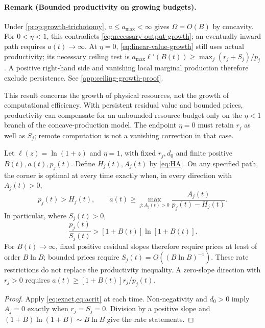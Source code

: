 \paragraph{Remark (Bounded productivity on growing budgets).}
Under \cref{prop:growth-trichotomy}, $a\leq a_{\max}<\infty$ gives
$\Omega=O(B)$ by concavity. For $0<\eta<1$, this contradicts
\cref{eq:necessary-output-growth}; an eventually inward path requires
$a(t)\to\infty$. At $\eta=0$, \cref{eq:linear-value-growth} still uses
actual productivity; its necessary ceiling test is
$a_{\max}\ell'(B(t))\geq\max_j(r_j+S_j)/p_j$.
A positive right-hand side and vanishing local marginal production
therefore exclude persistence. See \cref{app:ceiling-growth-proof}.

This result concerns the growth of physical resources, not the growth
of computational efficiency. With persistent residual value and bounded
prices, productivity can compensate for an unbounded resource budget
only on the $\eta<1$ branch of the concave-production model. The endpoint
$\eta=0$ must retain $r_j$ as well as $S_j$; remote computation is not a
vanishing correction in that case.

\begin{corollary}
\label{prop:persistence}
Let $\ell(z)=\ln(1+z)$ and $\eta=1$, with fixed $r_j,d_0$ and finite
positive $B(t),a(t),p_j(t)$. Define $H_j(t),A_j(t)$ by
\cref{eq:HA}. On any specified path, the corner is optimal at every
time exactly when, in every direction with $A_j(t)>0$,
\begin{equation}
 p_j(t)>H_j(t),\qquad
 a(t)\geq\max_{j:A_j(t)>0}
       \frac{A_j(t)}{p_j(t)-H_j(t)}.
 \label{eq:pathwise}
\end{equation}
In particular, where $S_j(t)>0$,
\begin{equation}
 \frac{p_j(t)}{S_j(t)}>[1+B(t)]\ln[1+B(t)].
 \label{eq:path-ratio}
\end{equation}
For $B(t)\to\infty$, fixed positive residual slopes therefore require
prices at least of order $B\ln B$; bounded prices require
$S_j(t)=O((B\ln B)^{-1})$. These rate restrictions do not replace the
productivity inequality. A zero-slope direction with $r_j>0$ requires
$a(t)\geq[1+B(t)]r_j/p_j(t)$.
\end{corollary}
\begin{proof}
Apply \cref{eq:exact,eq:acrit} at each time. Non-negativity and $d_0>0$
imply $A_j=0$ exactly when $r_j=S_j=0$. Division by a positive slope
and $(1+B)\ln(1+B)\sim B\ln B$ give the rate statements.
\end{proof}


